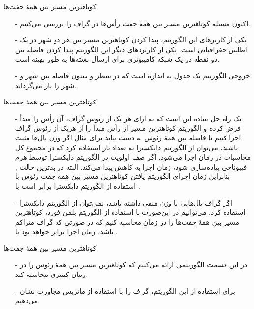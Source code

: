 
\begin{frame}{‌کوتاهترین مسیر بین همهٔ جفت‌ها}
\begin{itemize}\itemr
\item[-]
اکنون مسئله کوتاهترین مسیر بین همهٔ جفت رأس‌ها در گراف را بررسی می‌کنیم.
\item[-]
یکی از کاربرهای این الگوریتم، پیدا کردن کوتاهترین مسیر بین هر دو شهر در یک اطلس جغرافیایی است. یکی از کاربردهای دیگر این الگوریتم پیدا کردن فاصلهٔ بین دو نقطه در یک شبکه کامپیوتری برای ارسال بسته‌ها به طور بهینه است.
\item[-]
خروجی الگوریتم یک جدول به اندازهٔ
است که در سطر
و ستون
فاصله بین شهر
و شهر
را باز می‌گرداند.
\end{itemize}
\end{frame}


\begin{frame}{‌کوتاهترین مسیر بین همهٔ جفت‌ها}
\begin{itemize}\itemr
\item[-]
یک راه حل ساده این است که به ازای هر یک از رئوس گراف، آن رأس را مبدأ فرض کرده و الگوریتم کوتاهترین مسیر از رأس مبدأ را از هریک از رئوس گراف اجرا کنیم تا فاصله بین همهٔ رئوس به دست بیاید برای مثال اگر وزن یال‌ها مثبت باشند، می‌توان از الگوریتم دایکسترا به تعداد
بار استفاده کرد که در مجموع کل محاسبات در زمان
 اجرا می‌شود.
اگر صف اولویت در الگوریتم دایکسترا توسط هرم فیبوناچی پیاده‌سازی شود، زمان اجرا به
کاهش پیدا می‌کند.
البته در بدترین حالت 
,
بنابراین زمان اجرای الگوریتم یافتن کوتاهترین مسیر بین همه جفت رئوس با استفاده از الگوریتم دایکسترا برابر است با 
 .
\item[-]
اگر گراف یال‌هایی با وزن منفی داشته باشد، نمی‌توان از الگوریتم دایکسترا استفاده کرد. می‌توانیم در این‌صورت با استفاده از الگوریتم بلمن-فورد، کوتاهترین مسیر بین همهٔ جفت‌ها را در زمان
محاسبه کنیم که در صورتی که گراف متراکم باشد، زمان اجرا برابر خواهد بود با
 .
\end{itemize}
\end{frame}


\begin{frame}{‌کوتاهترین مسیر بین همهٔ جفت‌ها}
\begin{itemize}\itemr
\item[-]
در این قسمت الگوریتمی ارائه می‌کنیم که کوتاهترین مسیر بین همهٔ رئوس را در زمان کمتری محاسبه کند.
\item[-]
برای استفاده از این الگوریتم، گراف را با استفاده از ماتریس مجاورت نشان می‌دهیم.
\end{itemize}
\end{frame}


